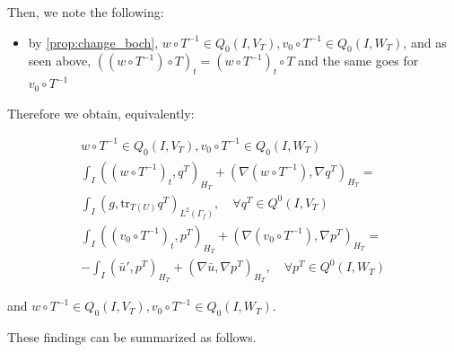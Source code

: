 \documentclass[english,a4paper,10pt,oneside]{scrbook}	%
\theoremstyle{break}
\theoremstyle{remark}
\newcommand{\tr}{\text{tr}}
\begin{document}
Then, we note the following:

\begin{itemize}
	\item by \cref{prop:change_boch}, $w\circ T^{-1} \in Q_0(I, V_T), v_0\circ T^{-1} \in Q_0(I,W_T) $, and as seen above, $((w\circ T^{-1})\circ T)_t = (w\circ T^{-1})_t\circ T$ and the same goes for $v_0\circ T^{-1}$
\end{itemize}

Therefore we obtain, equivalently:

\begin{align*}
w\circ T^{-1} \in Q_0(I, V_T), v_0\circ T^{-1} \in Q_0(I,W_T) \\
\int_I ((w\circ T^{-1})_t , q^T)_{H_T}+ (\nabla (w\circ T^{-1}), \nabla q^T)_{H_T} = \\\int_I(g,\tr_{T(U)} q^T)_{L^2(\Gamma_f)}, \quad \forall q^T \in Q^0(I, V_T) \\
\int_I ((v_0\circ T^{-1})_t,p^T)_{H_T} + (\nabla (v_0\circ T^{-1}), \nabla p^T)_{H_T}= \\-\int_I(\bar{u}',p^T)_{H_T}+(\nabla \bar{u}, \nabla p^T)_{H_T}, \quad \forall p^T \in Q^0(I, W_T)
\end{align*}

and $w\circ T^{-1} \in Q_0(I, V_T), v_0\circ T^{-1} \in Q_0(I,W_T)$.

These findings can be summarized as follows.
\end{document}
